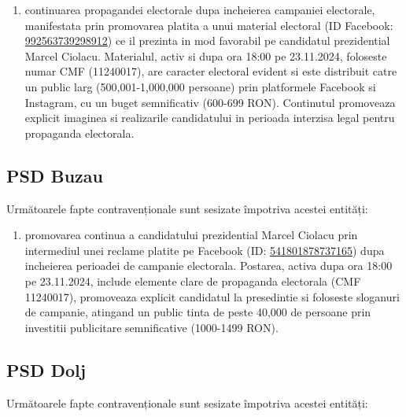 \documentclass[a4paper,12pt]{article}
\begin{document}
\begin{enumerate}[leftmargin=*, label=\arabic*.)]
    \item continuarea propagandei electorale dupa incheierea campaniei electorale, manifestata prin promovarea platita a unui material electoral (ID Facebook: \href{https://www.facebook.com/ads/library/?id=992563739298912}{992563739298912}) ce il prezinta in mod favorabil pe candidatul prezidential Marcel Ciolacu. Materialul, activ si dupa ora 18:00 pe 23.11.2024, foloseste numar CMF (11240017), are caracter electoral evident si este distribuit catre un public larg (500,001-1,000,000 persoane) prin platformele Facebook si Instagram, cu un buget semnificativ (600-699 RON). Continutul promoveaza explicit imaginea si realizarile candidatului in perioada interzisa legal pentru propaganda electorala.
\end{enumerate}

\vspace{0.5cm}

\subsection{PSD Buzau}
Următoarele fapte contravenționale sunt sesizate împotriva acestei entități:

\begin{enumerate}[leftmargin=*, label=\arabic*.)]
    \item promovarea continua a candidatului prezidential Marcel Ciolacu prin intermediul unei reclame platite pe Facebook (ID: \href{https://www.facebook.com/ads/library/?id=541801878737165}{541801878737165}) dupa incheierea perioadei de campanie electorala. Postarea, activa dupa ora 18:00 pe 23.11.2024, include elemente clare de propaganda electorala (CMF 11240017), promoveaza explicit candidatul la presedintie si foloseste sloganuri de campanie, atingand un public tinta de peste 40,000 de persoane prin investitii publicitare semnificative (1000-1499 RON).
\end{enumerate}

\vspace{0.5cm}

\subsection{PSD Dolj}
Următoarele fapte contravenționale sunt sesizate împotriva acestei entități:
\end{document}
